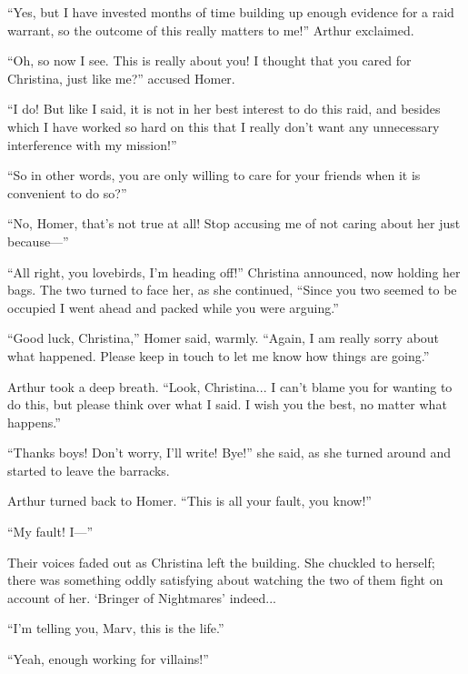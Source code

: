 \documentclass[showtrims,b6paper,draft,10pt]{memoir}
\begin{document}
``Yes, but I have invested months of time building up enough evidence for a raid warrant, so the outcome of this really matters to me!'' Arthur exclaimed.

``Oh, so now I see.  This is really about you!  I thought that you cared for Christina, just like me?'' accused Homer.

``I do!  But like I said, it is not in her best interest to do this raid, and besides which I have worked so hard on this that I really don't want any unnecessary interference with my mission!''

``So in other words, you are only willing to care for your friends when it is convenient to do so?''

``No, Homer, that's not true at all!  Stop accusing me of not caring about her just because---''

``All right, you lovebirds, I'm heading off!''  Christina announced, now holding her bags.  The two turned to face her, as she continued, ``Since you two seemed to be occupied I went ahead and packed while you were arguing.''

``Good luck, Christina,''  Homer said, warmly.  ``Again, I am really sorry about what happened.  Please keep in touch to let me know how things are going.''

Arthur took a deep breath.  ``Look, Christina... I can't blame you for wanting to do this, but please think over what I said.  I wish you the best, no matter what happens.''

``Thanks boys!  Don't worry, I'll write!  Bye!''  she said, as she turned around and started to leave the barracks.

Arthur turned back to Homer.  ``This is all your fault, you know!''

``My fault!  I---''

Their voices faded out as Christina left the building.  She chuckled to herself;  there was something oddly satisfying about watching the two of them fight on account of her.  `Bringer of Nightmares' indeed...

\timeskip
``I'm telling you, Marv, this is the life.''

``Yeah, enough working for villains!''
\appendix{}
\end{document}
